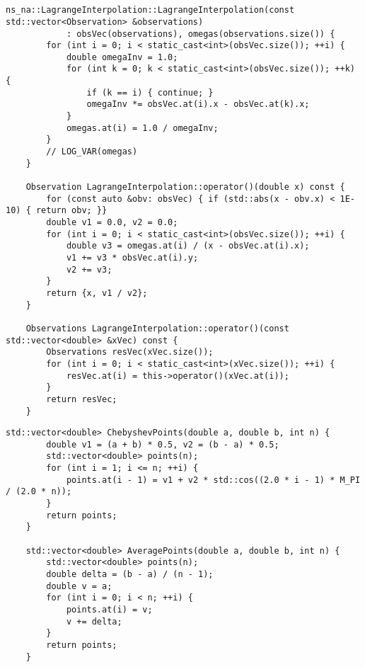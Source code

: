 \documentclass[12pt, onecolumn]{article}
\newcommand\normf{\fangsong}
\begin{document}
	\section{\normf{附录}}
	\begin{lstlisting}[caption=\normf LagrangeInterpolation类实现]
    ns_na::LagrangeInterpolation::LagrangeInterpolation(const std::vector<Observation> &observations)
            : obsVec(observations), omegas(observations.size()) {
        for (int i = 0; i < static_cast<int>(obsVec.size()); ++i) {
            double omegaInv = 1.0;
            for (int k = 0; k < static_cast<int>(obsVec.size()); ++k) {
                if (k == i) { continue; }
                omegaInv *= obsVec.at(i).x - obsVec.at(k).x;
            }
            omegas.at(i) = 1.0 / omegaInv;
        }
        // LOG_VAR(omegas)
    }

    Observation LagrangeInterpolation::operator()(double x) const {
        for (const auto &obv: obsVec) { if (std::abs(x - obv.x) < 1E-10) { return obv; }}
        double v1 = 0.0, v2 = 0.0;
        for (int i = 0; i < static_cast<int>(obsVec.size()); ++i) {
            double v3 = omegas.at(i) / (x - obsVec.at(i).x);
            v1 += v3 * obsVec.at(i).y;
            v2 += v3;
        }
        return {x, v1 / v2};
    }

    Observations LagrangeInterpolation::operator()(const std::vector<double> &xVec) const {
        Observations resVec(xVec.size());
        for (int i = 0; i < static_cast<int>(xVec.size()); ++i) {
            resVec.at(i) = this->operator()(xVec.at(i));
        }
        return resVec;
    }
	\end{lstlisting}
	\begin{lstlisting}[caption=\normf Chebyshev节点和等距节点生成函数]
    std::vector<double> ChebyshevPoints(double a, double b, int n) {
        double v1 = (a + b) * 0.5, v2 = (b - a) * 0.5;
        std::vector<double> points(n);
        for (int i = 1; i <= n; ++i) {
            points.at(i - 1) = v1 + v2 * std::cos((2.0 * i - 1) * M_PI / (2.0 * n));
        }
        return points;
    }

    std::vector<double> AveragePoints(double a, double b, int n) {
        std::vector<double> points(n);
        double delta = (b - a) / (n - 1);
        double v = a;
        for (int i = 0; i < n; ++i) {
            points.at(i) = v;
            v += delta;
        }
        return points;
    }
	\end{lstlisting}
	
	
	\newpage
\end{document}
